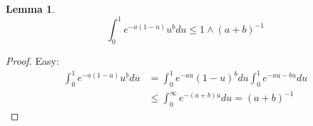 \documentclass[a4paper,12pt,reqno]{amsart}
\newcommand{\1}{{\bf 1}}
\newtheorem{lemma}[theorem]{Lemma}
\begin{document}
\begin{lemma}
\label{lemma:bound-int}
$$
\int_0^1 e^{-a(1- u)} u^{b} du \le 1\wedge (a+b)^{-1}
$$  
\end{lemma}
\begin{proof}
Easy:
\begin{equation*}
  \begin{split}
\int_0^1 e^{-a (1-u)} u^{b} du & =
    \int_0^1 e^{-a u} (1-u)^{b} du
    \int_0^1 e^{-a u - b u}  du
\\  & \le
    \int_0^\infty e^{-(a+b)u } du
= (a+b)^{-1}
  \end{split}
\end{equation*}
\end{proof}
\end{document}
